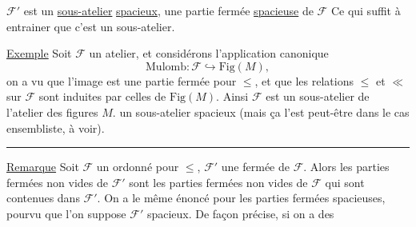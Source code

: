 
$\mathcal F'$ est un \uline{sous-atelier} \uline{spacieux},  une partie fermée \uline{spacieuse} de $\mathcal F$  Ce qui suffit à entrainer que c'est un sous-atelier.

\uline{Exemple} Soit $\mathcal F$ un atelier, et considérons l'application canonique 
\[
\mathrm{Mulomb}\colon\mathcal F\hookrightarrow\mathrm{Fig}(M),
\]
on a vu que l'image est une partie fermée pour $\leq$, et que les relations $\leq$ et $\ll$ sur $\mathcal F$ sont induites par celles de $\mathrm{Fig}(M)$. Ainsi $\mathcal F$ est un sous-atelier de l'atelier des figures  $M$.   un sous-atelier spacieux (mais ça l'est peut-être dans le cas ensembliste, à voir).

\par\noindent\hfill\rule{2cm}{.3pt}\hfill\mbox{}\par


\uline{Remarque} Soit $\mathcal F$ un ordonné pour $\leq$, $\mathcal F'$ une  fermée  de $\mathcal F$. Alors les parties fermées non vides de $\mathcal F'$ sont  les parties fermées non vides de $\mathcal F$ qui sont contenues dans $\mathcal F'$. On a le même énoncé pour les parties fermées spacieuses, pourvu que l'on suppose $\mathcal F'$ spacieux. De façon précise, si on a des

